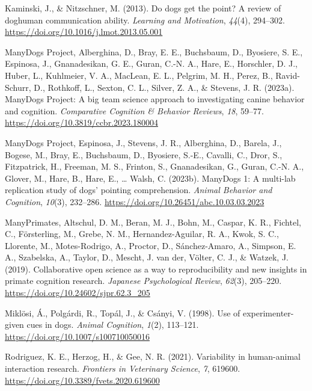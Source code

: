 \documentclass[
  man,floatsintext]{apa6}
\newlength{\cslhangindent}
\newlength{\cslentryspacingunit} %
\newenvironment{CSLReferences}[2] %
 {%
  \setlength{\parindent}{0pt}
  \ifodd #1
  \let\oldpar\par
  \def\par{\hangindent=\cslhangindent\oldpar}
  \fi
  \setlength{\parskip}{#2\cslentryspacingunit}
 }%
 {}
\begin{document}
\begin{CSLReferences}{1}{0}
\leavevmode{}%
Kaminski, J., \& Nitzschner, M. (2013). Do dogs get the point? {A} review of dog{\textendash}human communication ability. \emph{Learning and Motivation}, \emph{44}(4), 294--302. \url{https://doi.org/10.1016/j.lmot.2013.05.001}

\leavevmode{}%
ManyDogs Project, Alberghina, D., Bray, E. E., Buchsbaum, D., Byosiere, S. E., Espinosa, J., Gnanadesikan, G. E., Guran, C.-N. A., Hare, E., Horschler, D. J., Huber, L., Kuhlmeier, V. A., MacLean, E. L., Pelgrim, M. H., Perez, B., Ravid-Schurr, D., Rothkoff, L., Sexton, C. L., Silver, Z. A., \& Stevens, J. R. (2023a). {ManyDogs Project}: {A} big team science approach to investigating canine behavior and cognition. \emph{Comparative Cognition \& Behavior Reviews}, \emph{18}, 59--77. \url{https://doi.org/10.3819/ccbr.2023.180004}

\leavevmode{}%
ManyDogs Project, Espinosa, J., Stevens, J. R., Alberghina, D., Barela, J., Bogese, M., Bray, E., Buchsbaum, D., Byosiere, S.-E., Cavalli, C., Dror, S., Fitzpatrick, H., Freeman, M. S., Frinton, S., Gnanadesikan, G., Guran, C.-N. A., Glover, M., Hare, B., Hare, E., \ldots{} Walsh, C. (2023b). {ManyDogs} 1: {A} multi-lab replication study of dogs' pointing comprehension. \emph{Animal Behavior and Cognition}, \emph{10}(3), 232--286. \url{https://doi.org/10.26451/abc.10.03.03.2023}

\leavevmode{}%
ManyPrimates, Altschul, D. M., Beran, M. J., Bohn, M., Caspar, K. R., Fichtel, C., Försterling, M., Grebe, N. M., Hernandez-Aguilar, R. A., Kwok, S. C., Llorente, M., Motes-Rodrigo, A., Proctor, D., Sánchez-Amaro, A., Simpson, E. A., Szabelska, A., Taylor, D., Mescht, J. van der, Völter, C. J., \& Watzek, J. (2019). Collaborative open science as a way to reproducibility and new insights in primate cognition research. \emph{Japanese Psychological Review}, \emph{62}(3), 205--220. \url{https://doi.org/10.24602/sjpr.62.3_205}

\leavevmode{}%
Miklösi, Á., Polgárdi, R., Topál, J., \& Csányi, V. (1998). Use of experimenter-given cues in dogs. \emph{Animal Cognition}, \emph{1}(2), 113--121. \url{https://doi.org/10.1007/s100710050016}

\leavevmode{}%
Rodriguez, K. E., Herzog, H., \& Gee, N. R. (2021). Variability in human-animal interaction research. \emph{Frontiers in Veterinary Science}, \emph{7}, 619600. \url{https://doi.org/10.3389/fvets.2020.619600}


\end{CSLReferences}
\end{document}

